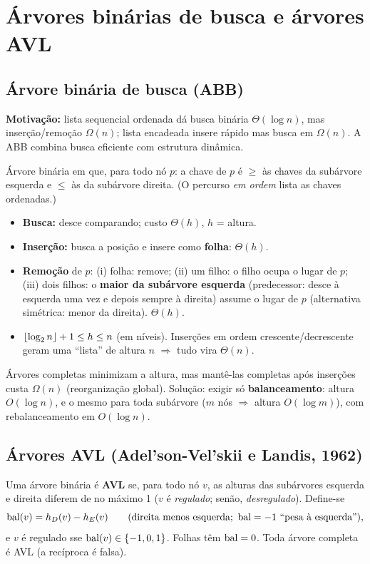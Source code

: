 \section{Árvores binárias de busca e árvores AVL}\label{sec:avl}

\subsection{Árvore binária de busca (ABB)}
\textbf{Motivação:} lista sequencial ordenada dá busca binária $\Theta(\log n)$, mas inserção/remoção $\Omega(n)$; lista encadeada insere rápido mas busca em $\Omega(n)$. A ABB combina busca eficiente com estrutura dinâmica.
\begin{defi}
Árvore binária em que, para todo nó $p$: a chave de $p$ é $\ge$ às chaves da subárvore esquerda e $\le$ às da subárvore direita. (O percurso \emph{em ordem} lista as chaves ordenadas.)
\end{defi}
\begin{itemize}
  \item \textbf{Busca:} desce comparando; custo $\Theta(h)$, $h$ = altura.
  \item \textbf{Inserção:} busca a posição e insere como \textbf{folha}: $\Theta(h)$.
  \item \textbf{Remoção} de $p$: (i) folha: remove; (ii) um filho: o filho ocupa o lugar de $p$; (iii) dois filhos: o \textbf{maior da subárvore esquerda} (predecessor: desce à esquerda uma vez e depois sempre à direita) assume o lugar de $p$ (alternativa simétrica: menor da direita). $\Theta(h)$.
  \item $\lfloor\log_2 n\rfloor+1\le h\le n$ (em níveis). Inserções em ordem crescente/decrescente geram uma ``lista'' de altura $n$ $\Rightarrow$ tudo vira $\Theta(n)$.
\end{itemize}
Árvores completas minimizam a altura, mas mantê-las completas após inserções custa $\Omega(n)$ (reorganização global). Solução: exigir só \textbf{balanceamento}: altura $O(\log n)$, e o mesmo para toda subárvore ($m$ nós $\Rightarrow$ altura $O(\log m)$), com rebalanceamento em $O(\log n)$.

\subsection{Árvores AVL (Adel'son-Vel'skii e Landis, 1962)}
\begin{defi}
Uma árvore binária é \textbf{AVL} se, para todo nó $v$, as alturas das subárvores esquerda e direita diferem de no máximo 1 ($v$ é \emph{regulado}; senão, \emph{desregulado}). Define-se
\[
\operatorname{bal}(v)=h_D(v)-h_E(v)\qquad(\text{direita menos esquerda; } \operatorname{bal}=-1 \text{ ``pesa à esquerda''}),
\]
e $v$ é regulado sse $\operatorname{bal}(v)\in\{-1,0,1\}$. Folhas têm $\operatorname{bal}=0$. Toda árvore completa é AVL (a recíproca é falsa).
\end{defi}

